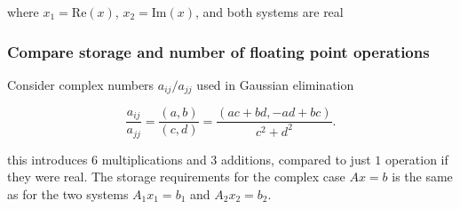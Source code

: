 where $x_1 = \text{Re} (x)$,  $x_2 = \text{Im} (x)$, and both systems are real

\subsubsection{Compare storage and number of floating point operations}%
\label{ssub:compare_storage_and_number_of_floating_point_operations}

Consider complex numbers $ a_{ij}/a_{jj} $ used in Gaussian elimination

\[
  \frac{a_{ij}}{a_{jj}} = \frac{(a,b)}{ (c,d) } = \frac{ (ac +bd, -ad
  +bc)}{c^2+d^2}
.\] 

this introduces $6$ multiplications and $3$ additions, compared to just $1$
operation if they were real. The storage requirements for the complex case $Ax
= b$ is the same as for the two systems $A_1x_1 = b_1$ and $A_2x_2 = b_2$.


